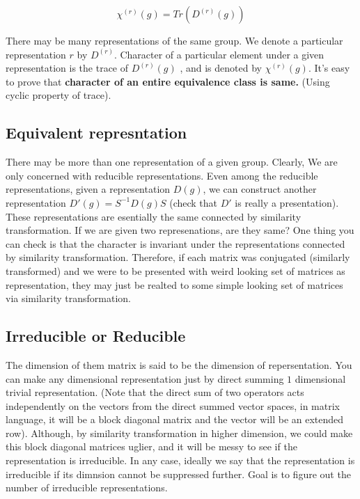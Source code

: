\documentclass{report}
\begin{document}
$$\chi^{(r)}(g) = Tr(D^{(r)}(g))$$

\noindent There may be many representations of the same group. We denote a particular representation $r$ by $D^{(r)}$. Character of a particular element under a given representation is the trace of $D^{(r)}(g)$ , and is denoted by $\chi^{(r)}(g)$. It's easy to prove that \textbf{character of an entire equivalence class is same.} (Using cyclic property of trace).

\subsection{Equivalent represntation} 

There may be more than one representation of a given group. Clearly, We are only concerned with reducible representations. Even among the reducible representations, given a representation $D(g)$, we can construct another representation $D'(g) = S^{-1} D(g) S$ (check that $D'$ is really a presentation). These representations are esentially the same connected by similarity transformation. If we are given two represenations, are they same? One thing you can check is that the character is invariant under the representations connected by similarity transformation. Therefore, if each matrix was conjugated (similarly transformed) and we were to be presented with weird looking set of matrices as representation, they may just be realted to some simple looking set of matrices via similarity transformation.

\subsection{Irreducible or Reducible}

The dimension of them matrix is said to be the dimension of repersentation. You can make any dimensional representation just by direct summing $1$ dimensional trivial representation. (Note that the direct sum of two operators acts independently on the vectors from the direct summed vector spaces, in matrix language, it will be a block diagonal matrix and the vector will be an extended row). Although, by similarity transformation in higher dimension, we could make this block diagonal matrices uglier, and it will be messy to see if the representation is irreducible. In any case, ideally we say that the representation is irreducible if its dimnsion cannot be suppressed further. Goal is to figure out the number of irreducible representations.
\end{document}

